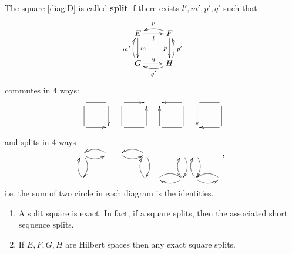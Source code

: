 \begin{definition}
The square \eqref{diag:D} is called \textbf{split} if there exists \(l',m',p',q'\) such that
\begin{equation}
\label{diag:split}
\xymatrix{
E \ar@{->}[r]_{l} \ar@{->}[d]^{m} & F \ar@{->}[d]_{p} \ar@/_/@{->}[l]_{l'} \\
G \ar@{->}[r]^{q} \ar@/^/@{->}[u]^{m'} & H \ar@/_/@{->}[u]_{p'} \ar@/^/@{->}[l]^{q'}
}
\end{equation}
commutes in 4 ways: 
\[
 \xymatrix{
{} \ar@{-}[r] \ar@{-}[d] & {} \ar@{->}[d] \\
{} \ar@{->}[r] & {}
}\quad
\xymatrix{
{} \ar@{->}[r] & {} \\
{} \ar@{-}[u] \ar@{-}[r] & {} \ar@{->}[u]
}\quad
\xymatrix{
{} & {} \ar@{->}[l] \\
{} \ar@{->}[u] \ar@{-}[r] & {} \ar@{-}[u]
}\quad
\xymatrix{
{} \ar@{->}[d] & {} \ar@{-}[l] \\
{} & {} \ar@{-}[u] \ar@{->}[l]
}
\]
and splits in 4 ways
\[
 \xymatrix{
{} \ar@/_/@{->}[r] \ar@/^/@{->}[d] & {} \ar@/_/@{->}[l] \\
{} \ar@/^/@{->}[u] & 
}\quad
\xymatrix{
{} \ar@/_/@{->}[r] & {} \ar@/_/@{->}[l] \ar@/^/@{->}[d] \\
 & {} \ar@/^/@{->}[u]
}\quad
\xymatrix{
 & {} \ar@/^/@{->}[d] \\
{} \ar@/^/@{->}[r] & {} \ar@/^/@{->}[u] \ar@/^/@{->}[l]
}\quad
\xymatrix{
{} \ar@/^/@{->}[d] &  \\
{} \ar@/^/@{->}[u] \ar@/_/@{->}[r] & {} \ar@/_/@{->}[l]
},
\]
i.e. the sum of two circle in each diagram is the identities.
\end{definition}

\begin{theorem}
\label{thm:split-exact}
\begin{enumerate}
\item A split square is exact. In fact, if a square splits, then the associated short sequence splits.
\item If \(E,F,G,H\) are Hilbert spaces then any exact square splits.
\end{enumerate}
\end{theorem}

